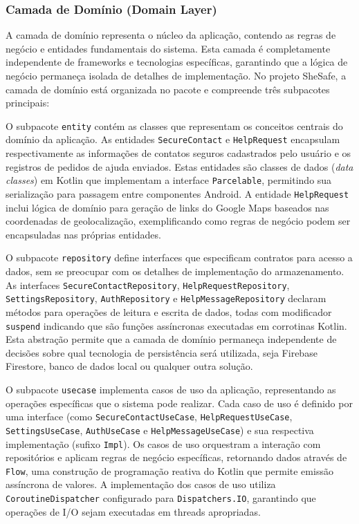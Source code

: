 \subsubsection{Camada de Domínio (Domain Layer)}
A camada de domínio representa o núcleo da aplicação, contendo as regras de negócio e entidades fundamentais do sistema. Esta camada é completamente independente de frameworks e tecnologias específicas, garantindo que a lógica de negócio permaneça isolada de detalhes de implementação. No projeto SheSafe, a camada de domínio está organizada no pacote  e compreende três subpacotes principais:

O subpacote \texttt{entity} contém as classes que representam os conceitos centrais do domínio da aplicação. As entidades \texttt{SecureContact} e \texttt{HelpRequest} encapsulam respectivamente as informações de contatos seguros cadastrados pelo usuário e os registros de pedidos de ajuda enviados. Estas entidades são classes de dados (\textit{data classes}) em Kotlin que implementam a interface \texttt{Parcelable}, permitindo sua serialização para passagem entre componentes Android. A entidade \texttt{HelpRequest} inclui lógica de domínio para geração de links do Google Maps baseados nas coordenadas de geolocalização, exemplificando como regras de negócio podem ser encapsuladas nas próprias entidades.

O subpacote \texttt{repository} define interfaces que especificam contratos para acesso a dados, sem se preocupar com os detalhes de implementação do armazenamento. As interfaces \texttt{SecureContactRepository}, \texttt{HelpRequestRepository}, \texttt{SettingsRepository}, \texttt{AuthRepository} e \texttt{HelpMessageRepository} declaram métodos para operações de leitura e escrita de dados, todas com modificador \texttt{suspend} indicando que são funções assíncronas executadas em corrotinas Kotlin. Esta abstração permite que a camada de domínio permaneça independente de decisões sobre qual tecnologia de persistência será utilizada, seja Firebase Firestore, banco de dados local ou qualquer outra solução.

O subpacote \texttt{usecase} implementa casos de uso da aplicação, representando as operações específicas que o sistema pode realizar. Cada caso de uso é definido por uma interface (como \texttt{SecureContactUseCase}, \texttt{HelpRequestUseCase}, \texttt{SettingsUseCase}, \texttt{AuthUseCase} e \texttt{HelpMessageUseCase}) e sua respectiva implementação (sufixo \texttt{Impl}). Os casos de uso orquestram a interação com repositórios e aplicam regras de negócio específicas, retornando dados através de \texttt{Flow}, uma construção de programação reativa do Kotlin que permite emissão assíncrona de valores. A implementação dos casos de uso utiliza \texttt{CoroutineDispatcher} configurado para \texttt{Dispatchers.IO}, garantindo que operações de I/O sejam executadas em threads apropriadas.

